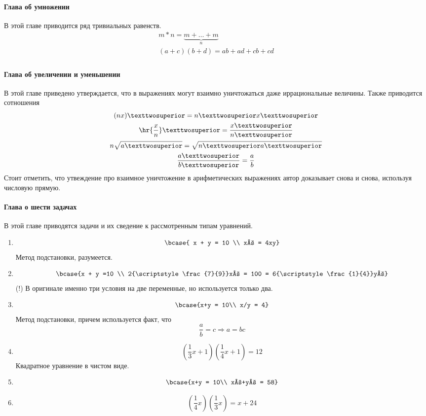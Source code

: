 \documentclass[unicode, 10pt, a4paper, oneside, fleqn]{article}
\begin{document}
\paragraph{Глава об умножении}
В этой главе приводится ряд тривиальных равенств.
\begin{gather}
  m*n = \underbrace{m+\dots+m}_{n} \\
  (a+c)(b+d) = ab + ad + cb + cd \\
\end{gather}
\paragraph{Глава об увеличении и уменьшении}
В этой главе приведено утверждается, что в выражениях могут 
взаимно уничтожаться даже иррациональные величины. Также
приводится сотношения
\begin{gather}
  (nx)² = n²x² \\
  \hr{\frac{x}{n}}² = \frac{x²}{n²} \\
  n\sqrt{a²} = \sqrt{n²a² } \\
  \frac{a²}{b²} = \frac{a}{b}
\end{gather}
Стоит отметить, что утвеждение про взаимное уничтожение 
в арифметических выражениях автор доказывает снова и снова,
используя числовую прямую.
\paragraph{Глава о шести задачах}
В этой главе приводятся задачи и их сведение к рассмотренным 
типам уравнений.
\begin{enumerate}
\item $$ \bcase{ x + y = 10 \\ x² = 4xy} $$ 
  Метод подстановки, разумеется.
\item $$\bcase {x + y =10 \\ 2{\scriptstyle\frac{7}{9}}x² = 100 = 6{\scriptstyle\frac{1}{4}}y²} $$
  (!) В оригинале именно три условия на две переменные, но используется только два.
\item $$ \bcase{x+y = 10\\ x/y = 4} $$
  Метод подстановки, причем используется факт, что 
  \begin{displaymath}
    \frac{a}{b} = c ⇒a = bc
  \end{displaymath}
  \item $$ ({\scriptstyle\frac{1}{3}}x +1)({\scriptstyle\frac{1}{4}}x+1) = 12 $$
    Квадратное уравнение в чистом виде.
  \item $$ \bcase{x+y = 10\\ x²+y² = 58} $$
  \item $$ ({\scriptstyle\frac{1}{4}}x)({\scriptstyle\frac{1}{3}}x) = x + 24 $$
\end{enumerate}
\end{document}
